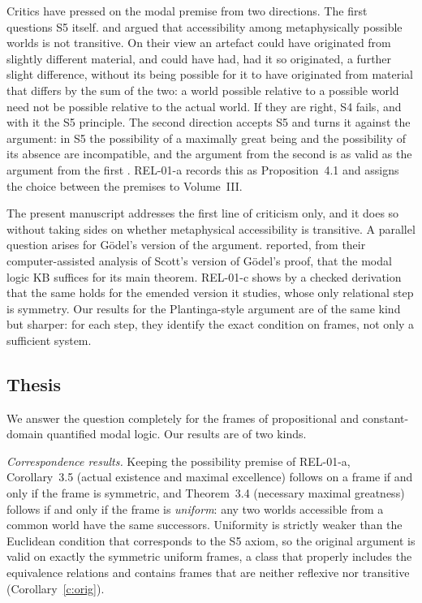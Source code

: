 \documentclass{situationist-preprint}
\begin{document}
Critics have pressed on the modal premise from two directions. The first questions S5 itself. \citet{Chandler1976} and \citet{Salmon1989} argued that accessibility among metaphysically possible worlds is not transitive. On their view an artefact could have originated from slightly different material, and could have had, had it so originated, a further slight difference, without its being possible for it to have originated from material that differs by the sum of the two: a world possible relative to a possible world need not be possible relative to the actual world. If they are right, S4 fails, and with it the S5 principle. The second direction accepts S5 and turns it against the argument: in S5 the possibility of a maximally great being and the possibility of its absence are incompatible, and the argument from the second is as valid as the argument from the first \citep{Oppy1995}. REL-01-a records this as Proposition~4.1 and assigns the choice between the premises to Volume~III.

The present manuscript addresses the first line of criticism only, and it does so without taking sides on whether metaphysical accessibility is transitive. A parallel question arises for Gödel's version of the argument. \citet{Benzmuller2014} reported, from their computer-assisted analysis of Scott's version of Gödel's proof, that the modal logic KB suffices for its main theorem. REL-01-c shows by a checked derivation that the same holds for the emended version it studies, whose only relational step is symmetry. Our results for the Plantinga-style argument are of the same kind but sharper: for each step, they identify the exact condition on frames, not only a sufficient system.

\subsection{Thesis}

We answer the question completely for the frames of propositional and constant-domain quantified modal logic. Our results are of two kinds.

\emph{Correspondence results.} Keeping the possibility premise of REL-01-a, Corollary~3.5 (actual existence and maximal excellence) follows on a frame if and only if the frame is symmetric, and Theorem~3.4 (necessary maximal greatness) follows if and only if the frame is \emph{uniform}: any two worlds accessible from a common world have the same successors. Uniformity is strictly weaker than the Euclidean condition that corresponds to the S5 axiom, so the original argument is valid on exactly the symmetric uniform frames, a class that properly includes the equivalence relations and contains frames that are neither reflexive nor transitive (Corollary~\ref{c:orig}).
\end{document}
